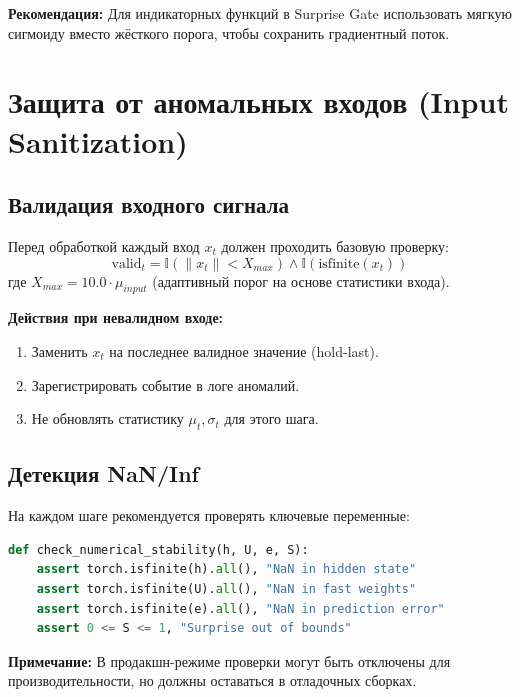 \textbf{Рекомендация:} Для индикаторных функций в Surprise Gate использовать мягкую сигмоиду вместо жёсткого порога, чтобы сохранить градиентный поток.

\section{Защита от аномальных входов (Input Sanitization)}

\subsection{Валидация входного сигнала}

Перед обработкой каждый вход $x_t$ должен проходить базовую проверку:
\begin{equation}
\text{valid}_t = \mathbb{I}\left(\|x_t\| < X_{max}\right) \land \mathbb{I}\left(\text{isfinite}(x_t)\right)
\label{eq:input_valid}
\end{equation}
где $X_{max} = 10.0 \cdot \mu_{input}$ (адаптивный порог на основе статистики входа).

\textbf{Действия при невалидном входе:}
\begin{enumerate}
    \item Заменить $x_t$ на последнее валидное значение (hold-last).
    \item Зарегистрировать событие в логе аномалий.
    \item Не обновлять статистику $\mu_t, \sigma_t$ для этого шага.
\end{enumerate}

\subsection{Детекция NaN/Inf}

На каждом шаге рекомендуется проверять ключевые переменные:

\begin{lstlisting}[language=Python, caption={Проверка численной стабильности}, label={lst:nan_check}]
def check_numerical_stability(h, U, e, S):
    assert torch.isfinite(h).all(), "NaN in hidden state"
    assert torch.isfinite(U).all(), "NaN in fast weights"
    assert torch.isfinite(e).all(), "NaN in prediction error"
    assert 0 <= S <= 1, "Surprise out of bounds"
\end{lstlisting}

\textbf{Примечание:} В продакшн-режиме проверки могут быть отключены для производительности, но должны оставаться в отладочных сборках.

